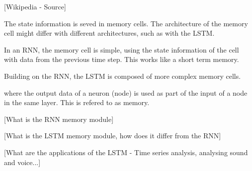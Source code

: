 [Wikipedia - Source]





The state information is seved in memory cells.
The architecture of the memory cell might differ with different architectures, such as with the LSTM.

In an RNN, the memory cell is simple, using the state information of the cell with data from the previous time step.
This works like a short term memory.

Building on the RNN, the LSTM is composed of more complex memory cells.



where the output data of a neuron (node) is used as part of the input of a node in the same layer.
This is refered to as memory.

[What is the RNN memory module]

[What is the LSTM memory module, how does it differ from the RNN]

[What are the applications of the LSTM - Time series analysis, analysing sound and voice...]

\fi
